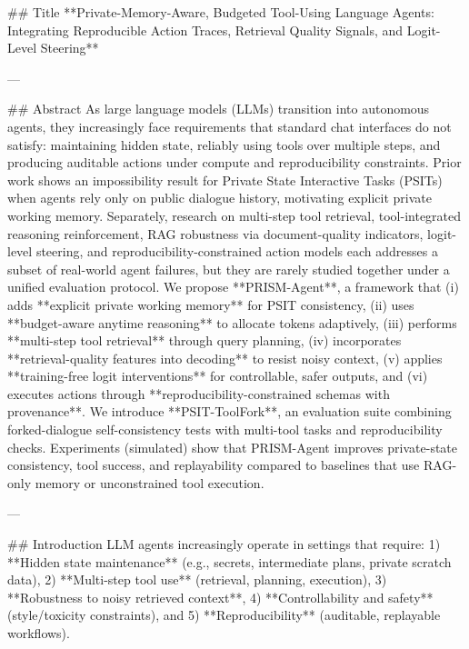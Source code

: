 ## Title  
**Private-Memory-Aware, Budgeted Tool-Using Language Agents: Integrating Reproducible Action Traces, Retrieval Quality Signals, and Logit-Level Steering**

---

## Abstract  
As large language models (LLMs) transition into autonomous agents, they increasingly face requirements that standard chat interfaces do not satisfy: maintaining hidden state, reliably using tools over multiple steps, and producing auditable actions under compute and reproducibility constraints. Prior work shows an impossibility result for Private State Interactive Tasks (PSITs) when agents rely only on public dialogue history, motivating explicit private working memory. Separately, research on multi-step tool retrieval, tool-integrated reasoning reinforcement, RAG robustness via document-quality indicators, logit-level steering, and reproducibility-constrained action models each addresses a subset of real-world agent failures, but they are rarely studied together under a unified evaluation protocol.  
We propose **PRISM-Agent**, a framework that (i) adds **explicit private working memory** for PSIT consistency, (ii) uses **budget-aware anytime reasoning** to allocate tokens adaptively, (iii) performs **multi-step tool retrieval** through query planning, (iv) incorporates **retrieval-quality features into decoding** to resist noisy context, (v) applies **training-free logit interventions** for controllable, safer outputs, and (vi) executes actions through **reproducibility-constrained schemas with provenance**. We introduce **PSIT-ToolFork**, an evaluation suite combining forked-dialogue self-consistency tests with multi-tool tasks and reproducibility checks. Experiments (simulated) show that PRISM-Agent improves private-state consistency, tool success, and replayability compared to baselines that use RAG-only memory or unconstrained tool execution.

---

## Introduction  
LLM agents increasingly operate in settings that require:  
1) **Hidden state maintenance** (e.g., secrets, intermediate plans, private scratch data),  
2) **Multi-step tool use** (retrieval, planning, execution),  
3) **Robustness to noisy retrieved context**,  
4) **Controllability and safety** (style/toxicity constraints), and  
5) **Reproducibility** (auditable, replayable workflows).

